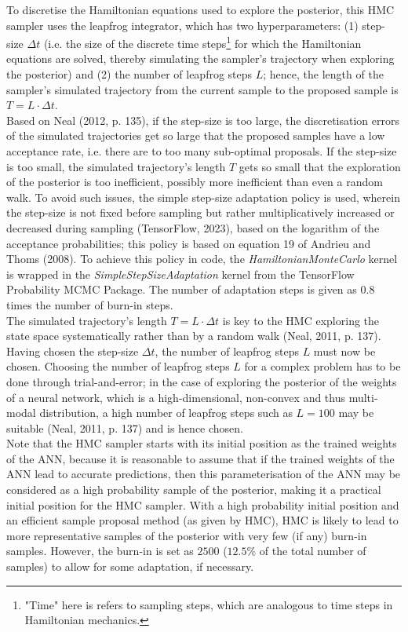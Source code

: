\documentclass[conference]{IEEEtran}
\begin{document}
To discretise the Hamiltonian equations used to explore the posterior, this HMC sampler uses the leapfrog integrator, which has two hyperparameters: (1) step-size $\Delta t$ (i.e. the size of the discrete time steps\footnote{"Time" here is refers to sampling steps, which are analogous to time steps in Hamiltonian mechanics.} for which the Hamiltonian equations are solved, thereby simulating the sampler's trajectory when exploring the posterior) and (2) the number of leapfrog steps $L$; hence, the length of the sampler's simulated trajectory from the current sample to the proposed sample is $T = L \cdot \Delta t$.\\

Based on Neal (2012, p. 135), if the step-size is too large, the discretisation errors of the simulated trajectories get so large that the proposed samples have a low acceptance rate, i.e. there are to too many sub-optimal proposals. If the step-size is too small, the simulated trajectory's length $T$ gets so small that the exploration of the posterior is too inefficient, possibly more inefficient than even a random walk. To avoid such issues, the simple step-size adaptation policy is used, wherein the step-size is not fixed before sampling but rather multiplicatively increased or decreased during sampling (TensorFlow, 2023), based on the logarithm of the acceptance probabilities; this policy is based on equation 19 of Andrieu and Thoms (2008). To achieve this policy in code, the \textit{HamiltonianMonteCarlo} kernel is wrapped in the \textit{SimpleStepSizeAdaptation} kernel from the TensorFlow Probability MCMC Package. The number of adaptation steps is given as 0.8 times the number of burn-in steps.\\

The simulated trajectory's length $T = L \cdot \Delta t$ is key to the HMC exploring the state space systematically rather than by a random walk (Neal, 2011, p. 137). Having chosen the step-size $\Delta t$, the number of leapfrog steps $L$ must now be chosen. Choosing the number of leapfrog steps $L$ for a complex problem has to be done through trial-and-error; in the case of exploring the posterior of the weights of a neural network, which is a high-dimensional, non-convex and thus multi-modal distribution, a high number of leapfrog steps such as $L = 100$ may be suitable (Neal, 2011, p. 137) and is hence chosen.\\

Note that the HMC sampler starts with its initial position as the trained weights of the ANN, because it is reasonable to assume that if the trained weights of the ANN lead to accurate predictions, then this parameterisation of the ANN may be considered as a high probability sample of the posterior, making it a practical initial position for the HMC sampler. With a high probability initial position and an efficient sample proposal method (as given by HMC), HMC is likely to lead to more representative samples  of the posterior with very few (if any) burn-in samples. However, the burn-in is set as $2500$ ($12.5\%$ of the total number of samples) to allow for some adaptation, if necessary.
\end{document}

